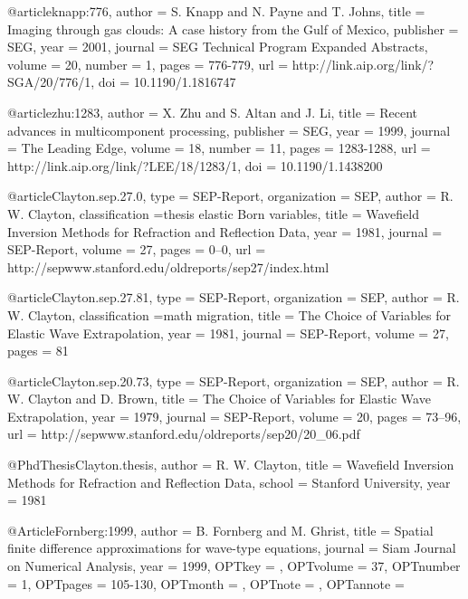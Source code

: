 @article{knapp:776,
  author =	 {S. Knapp and N. Payne and T. Johns},
  title =	 {Imaging through gas clouds: A case history from the
                  Gulf of Mexico},
  publisher =	 {SEG},
  year =	 2001,
  journal =	 {SEG Technical Program Expanded Abstracts},
  volume =	 20,
  number =	 1,
  pages =	 {776-779},
  url =		 {http://link.aip.org/link/?SGA/20/776/1},
  doi =		 {10.1190/1.1816747}
}

@article{zhu:1283,
  author =	 {X. Zhu and S. Altan and J. Li},
  title =	 {Recent advances in multicomponent processing},
  publisher =	 {SEG},
  year =	 1999,
  journal =	 {The Leading Edge},
  volume =	 18,
  number =	 11,
  pages =	 {1283-1288},
  url =		 {http://link.aip.org/link/?LEE/18/1283/1},
  doi =		 {10.1190/1.1438200}
}

@article{Clayton.sep.27.0,
  type =	 {SEP-Report},
  organization = {SEP},
  author =	 {R. W. Clayton},
  classification ={thesis elastic {Born} variables},
  title =	 {Wavefield Inversion Methods for Refraction and
                  Reflection Data},
  year =	 1981,
  journal =	 {SEP-Report},
  volume =	 27,
  pages =	 {0--0},
  url =
                  {http://sepwww.stanford.edu/oldreports/sep27/index.html}
}

@article{Clayton.sep.27.81,
  type =	 {SEP-Report},
  organization = {SEP},
  author =	 {R. W. Clayton},
  classification ={math migration},
  title =	 {The Choice of Variables for Elastic Wave
                  Extrapolation},
  year =	 1981,
  journal =	 {SEP-Report},
  volume =	 27,
  pages =	 81
}

@article{Clayton.sep.20.73,
  type =	 {SEP-Report},
  organization = {SEP},
  author =	 {R. W. Clayton and D. Brown},
  title =	 {The Choice of Variables for Elastic Wave
                  Extrapolation},
  year =	 1979,
  journal =	 {SEP-Report},
  volume =	 20,
  pages =	 {73--96},
  url =
                  {http://sepwww.stanford.edu/oldreports/sep20/20_06.pdf}
}

@PhdThesis{Clayton.thesis,
  author =	 {R. W. Clayton},
  title =	 {Wavefield Inversion Methods for Refraction and
                  Reflection Data},
  school =	 {Stanford University},
  year =	 1981
}

@Article{Fornberg:1999,
  author = 	 {B. Fornberg and M. Ghrist},
  title = 	 {Spatial finite difference approximations for
                  wave-type equations},
  journal = 	 {Siam Journal on Numerical Analysis},
  year = 	 {1999},
  OPTkey = 	 {},
  OPTvolume = 	 {37},
  OPTnumber = 	 {1},
  OPTpages = 	 {105-130},
  OPTmonth = 	 {},
  OPTnote = 	 {},
  OPTannote = 	 {}
}

